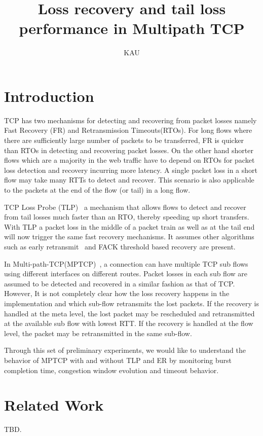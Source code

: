 \documentclass[12pt,draftcls,onecolumn]{IEEEtran}
\title{Loss recovery and tail loss performance in Multipath TCP}
\author{KAU}
\begin{document}
\maketitle

\begin{abstract}
\end{abstract}

\section{Introduction}
TCP has two mechanisms for detecting and recovering from packet losses namely Fast Recovery (FR) and Retransmission Timeouts(RTOs). For long flows where there are sufficiently large number of packets 
to be transferred, FR is quicker than RTOs in detecting and recovering packet losses. On the other hand shorter flows which are a majority in the web traffic have to depend on RTOs for packet loss detection 
and recovery incurring more latency. A single packet loss in a short flow may take many RTTs to detect and recover. This scenario is also applicable to the packets at the end of the flow (or tail) in a long 
flow.

TCP Loss Probe (TLP)~\cite{ietftlp} a mechanism that allows flows to detect and recover from tail losses much faster than an RTO, thereby speeding up short transfers. With TLP a packet loss in the middle 
of a packet train as well as at the tail end will now trigger the same fast recovery mechanisms. It assumes other algorithms such as early retransmit~\cite{rfc5827} and FACK threshold based recovery are 
present.

In Multi-path-TCP(MPTCP)~\cite{rfc6824}, a connection can have multiple TCP sub flows using different interfaces on different routes. Packet losses in each sub flow are assumed to be detected and recovered 
in a similar fashion as that of TCP. However, It is not completely clear how the loss recovery happens in the implementation and which sub-flow retransmits the lost packets. If the recovery is handled at the 
meta level, the lost packet may be rescheduled and retransmitted at the available sub flow with lowest RTT. If the recovery is handled at the flow level, the packet may be retransmitted in the same sub-flow. 

Through this set of preliminary experiments, we would like to understand the behavior of MPTCP with and without TLP and ER by monitoring burst completion time, congestion window evolution and timeout 
behavior.

\section{Related Work}\label{relwork}
TBD.
\end{document}
